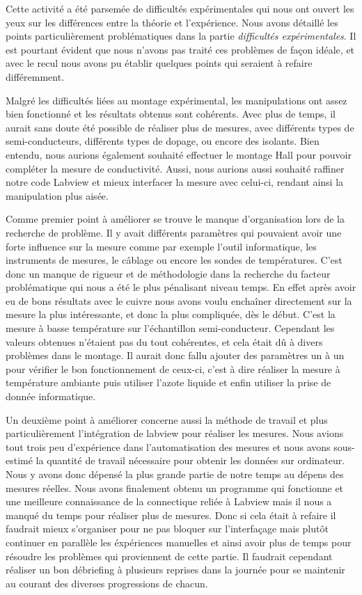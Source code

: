 Cette activité a été parsemée de difficultés expérimentales qui nous ont ouvert les yeux sur les différences entre la théorie et l'expérience. Nous avons détaillé les points particulièrement problématiques dans la partie \emph{difficultés expérimentales}. Il est pourtant évident que nous n'avons pas traité ces problèmes de façon idéale, et avec le recul nous avons pu établir quelques points qui seraient à refaire différemment.

\bigskip

Malgré les difficultés liées au montage expérimental, les manipulations ont assez bien fonctionné et les résultats obtenus sont cohérents.
Avec plus de temps, il aurait sans doute été possible de réaliser plus de mesures, avec différents types de semi-conducteurs, différents types de dopage, ou encore des isolants.
Bien entendu, nous aurions également souhaité effectuer le montage Hall pour pouvoir compléter la mesure de conductivité.
Aussi, nous aurions aussi souhaité raffiner notre code Labview et mieux interfacer la mesure avec celui-ci, rendant ainsi la manipulation plus aisée.

\bigskip

Comme premier point à améliorer se trouve le manque d'organisation lors de la recherche de problème. Il y avait différents paramètres qui pouvaient avoir une forte influence sur la mesure comme par exemple l'outil informatique, les instruments de mesures, le câblage ou encore les sondes de températures. C'est donc un manque de rigueur et de méthodologie dans la recherche du facteur problématique qui nous a été le plus pénalisant niveau temps. En effet après avoir eu de bons résultats avec le cuivre nous avons voulu enchaîner directement sur la mesure la plus intéressante, et donc la plus compliquée, dès le début. C'est la mesure à basse température sur l'échantillon semi-conducteur. Cependant les valeurs obtenues n'étaient pas du tout cohérentes, et cela était dû à divers problèmes dans le montage. Il aurait donc fallu ajouter des paramètres un à un pour vérifier le bon fonctionnement de ceux-ci, c'est à dire réaliser la mesure à température ambiante puis utiliser l'azote liquide et enfin utiliser la prise de donnée informatique. 

\bigskip

Un deuxième point à améliorer concerne aussi la méthode de travail et plus particulièrement l'intégration de labview pour réaliser les mesures. Nous avions tout trois peu d'expérience dans l'automatisation des mesures et nous avons sous-estimé la quantité de travail nécessaire pour obtenir les données sur ordinateur. Nous y avons donc dépensé la plus grande partie de notre temps au dépens des mesures réelles. Nous avons finalement obtenu un programme qui fonctionne et une meilleure connaissance de la connectique reliée à Labview mais il nous a manqué du temps pour réaliser plus de mesures. Donc si cela était à refaire il faudrait mieux s'organiser pour ne pas bloquer sur l'interfaçage mais plutôt continuer en parallèle les éxpériences manuelles et ainsi avoir plus de temps pour résoudre les problèmes qui proviennent de cette partie. Il faudrait cependant réaliser un bon débriefing à plusieurs reprises dans la journée pour se maintenir au courant des diverses progressions de chacun. 

